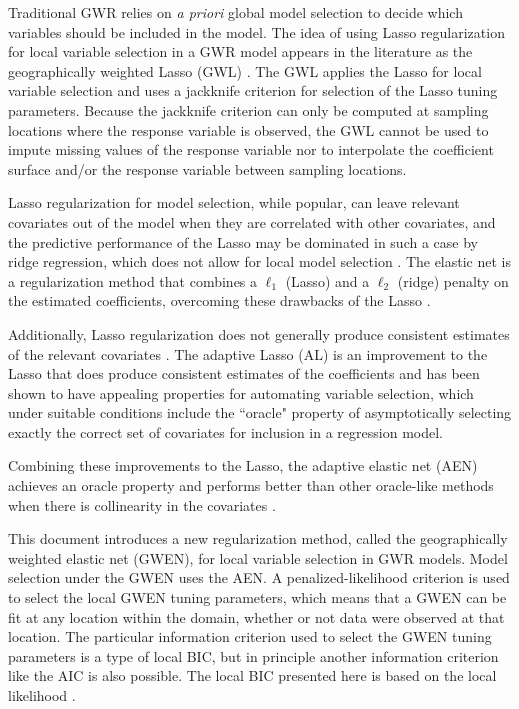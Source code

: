 \documentclass[authoryear, review, 11pt]{elsarticle}
\begin{document}
	Traditional GWR relies on \emph{a priori} global model selection to decide which variables should be included in the model. The idea of using Lasso regularization for local variable selection in a GWR model appears in the literature as the geographically weighted Lasso (GWL) \citep{Wheeler:2009}. The GWL applies the Lasso for local variable selection and uses a jackknife criterion for selection of the Lasso tuning parameters. Because the jackknife criterion can only be computed at sampling locations where the response variable is observed, the GWL cannot be used to impute missing values of the response variable nor to interpolate the coefficient surface and/or the response variable between sampling locations.
	
	Lasso regularization for model selection, while popular, can leave relevant covariates out of the model when they are correlated with other covariates, and the predictive performance of the Lasso may be dominated in such a case by ridge regression, which does not allow for local model selection \citep{Tibshirani:1996}. The elastic net is a regularization method that combines a $\ell_1$ (Lasso) and a $\ell_2$ (ridge) penalty on the estimated coefficients, overcoming these drawbacks of the Lasso \citep{Zou:2005}.
	
	Additionally, Lasso regularization does not generally produce consistent estimates of the relevant covariates \citep{Leng-2006}. The adaptive Lasso (AL) \citep{Zou:2006} is an improvement to the Lasso that does produce consistent estimates of the coefficients and has been shown to have appealing properties for automating variable selection, which under suitable conditions include the ``oracle" property of asymptotically selecting exactly the correct set of covariates for inclusion in a regression model.
	
	Combining these improvements to the Lasso, the adaptive elastic net (AEN) achieves an oracle property and performs better than other oracle-like methods when there is collinearity in the covariates \citep{Zou:2009}.
	
	This document introduces a new regularization method, called the geographically weighted elastic net (GWEN), for local variable selection in GWR models. Model selection under the GWEN uses the AEN. A penalized-likelihood criterion is used to select the local GWEN tuning parameters, which means that a GWEN can be fit at any location within the domain, whether or not data were observed at that location. The particular information criterion used to select the GWEN tuning parameters is a type of local BIC, but in principle another information criterion like the AIC is also possible. The local BIC presented here is based on the local likelihood \citep{Loader:1999}.
	
\end{document}
